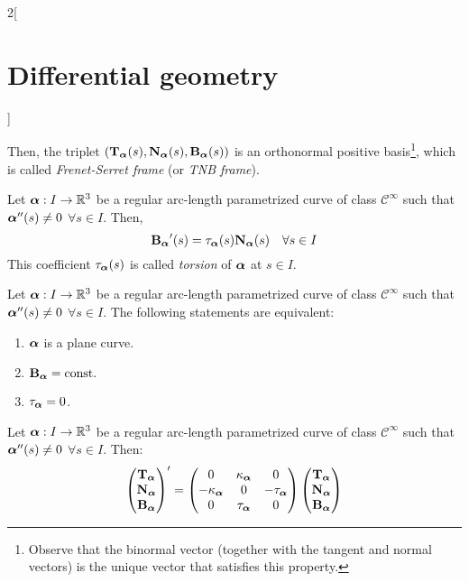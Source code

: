 \documentclass[../../../main.tex]{subfiles}
\begin{document}
\begin{multicols}{2}[\section{Differential geometry}]
\begin{definition}
    Then, the triplet $(\T\alpha(s),\N\alpha(s),\B\alpha(s))$ is an orthonormal positive basis\footnote{Observe that the binormal vector (together with the tangent and normal vectors) is the unique vector that satisfies this property.}, which is called \emph{Frenet-Serret frame} (or \emph{TNB frame}).
  \end{definition}
  \begin{proposition}
    Let $\vf{\alpha}:I\rightarrow\RR^3$ be a regular arc-length parametrized curve of class $\mathcal{C}^\infty$ such that $\vf{\alpha}''(s)\ne 0$ $\forall s\in I$. Then, $$\B\alpha'(s)=\ta\alpha(s)\N\alpha(s)\quad\forall s\in I$$ This coefficient $\ta\alpha(s)$ is called \emph{torsion} of $\vf{\alpha}$ at $s\in I$.
  \end{proposition}
  \begin{proposition}
    Let $\vf{\alpha}:I\rightarrow\RR^3$ be a regular arc-length parametrized curve of class $\mathcal{C}^\infty$ such that $\vf{\alpha}''(s)\ne 0$ $\forall s\in I$. The following statements are equivalent:
    \begin{enumerate}
      \item $\vf{\alpha}$ is a plane curve.
      \item $\B\alpha=\const$
      \item $\ta\alpha=0$.
    \end{enumerate}
  \end{proposition}
  \begin{theorem}
    Let $\vf{\alpha}:I\rightarrow\RR^3$ be a regular arc-length parametrized curve of class $\mathcal{C}^\infty$ such that $\vf{\alpha}''(s)\ne 0$ $\forall s\in I$. Then:
    $$
      \begin{pmatrix}
        \T\alpha \\
        \N\alpha \\
        \B\alpha \\
      \end{pmatrix}'=
      \begin{pmatrix}
        0          & \ka\alpha & 0          \\
        -\ka\alpha & 0         & -\ta\alpha \\
        0          & \ta\alpha & 0
      \end{pmatrix}
      \begin{pmatrix}
        \T\alpha \\
        \N\alpha \\
        \B\alpha \\

\end{pmatrix}$$
\end{theorem}
\end{multicols}
\end{document}
